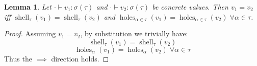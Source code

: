 \documentclass{report}
\newtheorem{lemma}{Lemma}
\theoremstyle{definition}
\DeclareMathOperator{\shell}{shell}
\DeclareMathOperator{\holes}{holes}
\begin{document}
\begin{lemma}
	\label{lem:values-shells-holes}
	Let \(\cdot \vdash v_1 : \sigma(\tau)\) and \(\cdot \vdash v_2 : \sigma(\tau)\) be concrete values.
	Then \(v_1 = v_2\) iff \(\shell_\tau(v_1) = \shell_\tau(v_2)\) and \(\holes_{\alpha \in \tau}(v_1) = \holes_{\alpha \in \tau}(v_2) \; \forall \alpha \in \tau\).
\end{lemma}
\begin{proof}
	Assuming \(v_1 = v_2\), by substitution we trivially have:
	\begin{equation}
		\shell_\tau(v_1) = \shell_\tau(v_2)
	\end{equation}
	\begin{equation}
		\holes_\alpha(v_1) = \holes_\alpha(v_2) \; \forall \alpha \in \tau
	\end{equation}
	Thus the \(\implies\) direction holds.


\end{proof}
\end{document}
